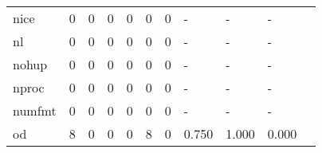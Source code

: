 \begin{longtable}{lp{1.2cm}p{1.2cm}p{1.2cm}p{1.2cm}p{1.2cm}p{1.2cm}p{1.2cm}p{1.2cm}p{1.2cm}p{1.2cm}}
nice      &                                     0 &                                                  0 &                                                  0 &                                                  0 &                                                  0 &                                                  0 &                                             - &                                                  - &                                                  - \\
nl        &                                     0 &                                                  0 &                                                  0 &                                                  0 &                                                  0 &                                                  0 &                                             - &                                                  - &                                                  - \\
nohup     &                                     0 &                                                  0 &                                                  0 &                                                  0 &                                                  0 &                                                  0 &                                             - &                                                  - &                                                  - \\
nproc     &                                     0 &                                                  0 &                                                  0 &                                                  0 &                                                  0 &                                                  0 &                                             - &                                                  - &                                                  - \\
numfmt    &                                     0 &                                                  0 &                                                  0 &                                                  0 &                                                  0 &                                                  0 &                                             - &                                                  - &                                                  - \\
od        &                                     8 &                                                  0 &                                                  0 &                                                  0 &                                                  8 &                                                  0 &                                         0.750 &                                              1.000 &                                              0.000 \\

\end{longtable}
